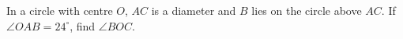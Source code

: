 In a circle with centre $O$, $AC$ is a diameter and $B$ lies on the circle above $AC$. If $\angle OAB=24^\circ$, find $\angle BOC$.
